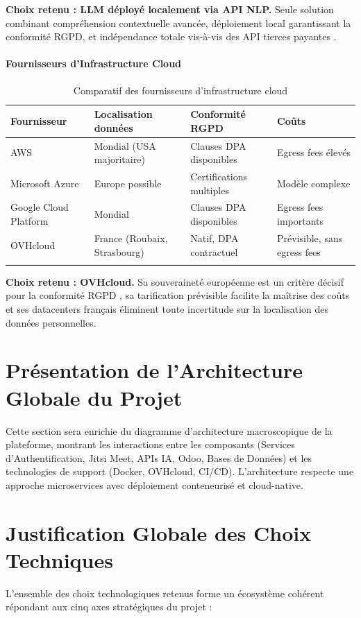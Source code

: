 \textbf{Choix retenu : LLM déployé localement via API NLP.} Seule solution combinant compréhension contextuelle avancée, déploiement local garantissant la conformité RGPD, et indépendance totale vis-à-vis des API tierces payantes \cite{whisper}.

\paragraph{Fournisseurs d'Infrastructure Cloud}

\begin{longtable}{|m{3cm}|m{3.5cm}|m{3cm}|m{3cm}|}
\hline
\textbf{Fournisseur} & \textbf{Localisation données} & \textbf{Conformité RGPD} & \textbf{Coûts} \\
\hline
\endhead
\endfoot
\endlastfoot
\hline
AWS & Mondial (USA majoritaire) & Clauses DPA disponibles & Egress fees élevés \\
\hline
Microsoft Azure & Europe possible & Certifications multiples & Modèle complexe \\
\hline
Google Cloud Platform & Mondial & Clauses DPA disponibles & Egress fees importants \\
\hline
OVHcloud & France (Roubaix, Strasbourg) & Natif, DPA contractuel & Prévisible, sans egress fees \\
\hline
\captionsetup{justification=centering,margin=2cm}
\caption{Comparatif des fournisseurs d'infrastructure cloud}
\label{tab:cloud}
\end{longtable}

\textbf{Choix retenu : OVHcloud.} Sa souveraineté européenne est un critère décisif pour la conformité RGPD \cite{rgpd}, sa tarification prévisible facilite la maîtrise des coûts et ses datacenters français éliminent toute incertitude sur la localisation des données personnelles.

\section{Présentation de l'Architecture Globale du Projet}

Cette section sera enrichie du diagramme d'architecture macroscopique de la plateforme, montrant les interactions entre les composants (Services d'Authentification, Jitsi Meet, APIs IA, Odoo, Bases de Données) et les technologies de support (Docker, OVHcloud, CI/CD). L'architecture respecte une approche microservices avec déploiement conteneurisé et cloud-native.

\section*{Justification Globale des Choix Techniques}
L'ensemble des choix technologiques retenus forme un écosystème cohérent répondant aux cinq axes stratégiques du projet :

